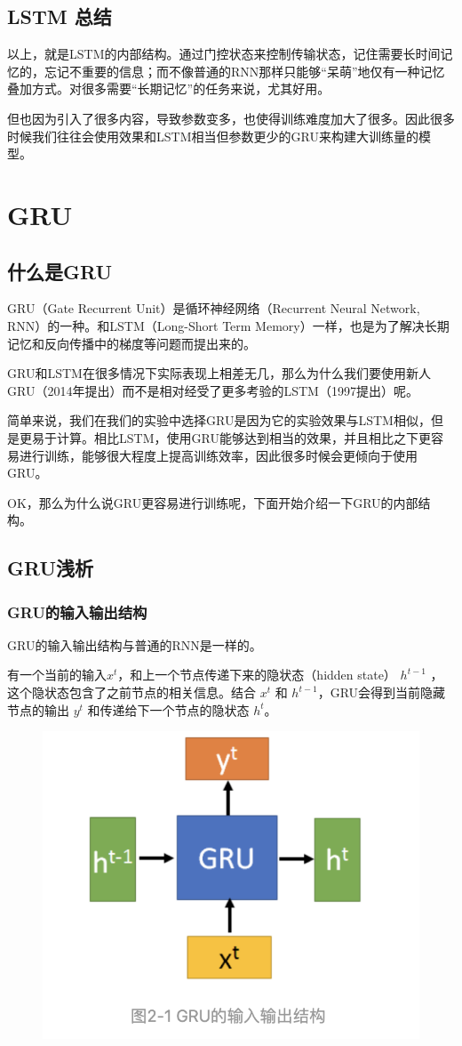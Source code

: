 \documentclass[12pt]{article}
\begin{document}
\subsection{LSTM 总结}
以上，就是LSTM的内部结构。通过门控状态来控制传输状态，记住需要长时间记忆的，忘记不重要的信息；而不像普通的RNN那样只能够“呆萌”地仅有一种记忆叠加方式。对很多需要“长期记忆”的任务来说，尤其好用。

但也因为引入了很多内容，导致参数变多，也使得训练难度加大了很多。因此很多时候我们往往会使用效果和LSTM相当但参数更少的GRU来构建大训练量的模型。

\section{GRU\cite{Everyone_Can_Understand_GRU}}
\subsection{什么是GRU}
GRU（Gate Recurrent Unit）是循环神经网络（Recurrent Neural Network, RNN）的一种。和LSTM（Long-Short Term Memory）一样，也是为了解决长期记忆和反向传播中的梯度等问题而提出来的。

GRU和LSTM在很多情况下实际表现上相差无几，那么为什么我们要使用新人GRU（2014年提出）而不是相对经受了更多考验的LSTM（1997提出）呢。

简单来说，我们在我们的实验中选择GRU是因为它的实验效果与LSTM相似，但是更易于计算。相比LSTM，使用GRU能够达到相当的效果，并且相比之下更容易进行训练，能够很大程度上提高训练效率，因此很多时候会更倾向于使用GRU。

OK，那么为什么说GRU更容易进行训练呢，下面开始介绍一下GRU的内部结构。

\subsection{GRU浅析}
\subsubsection{GRU的输入输出结构}
GRU的输入输出结构与普通的RNN是一样的。

有一个当前的输入$x^t$，和上一个节点传递下来的隐状态（hidden state） $h^{t-1}$ ，这个隐状态包含了之前节点的相关信息。结合 $x^t$ 和 $h^{t-1}$，GRU会得到当前隐藏节点的输出 $y^t$ 和传递给下一个节点的隐状态 $h^t$。
\begin{figure}[H]
    \centering
    \includegraphics[width=.6\textwidth]{fig/GRU_Structure_InputOutput.png}
\end{figure}
\end{document}
